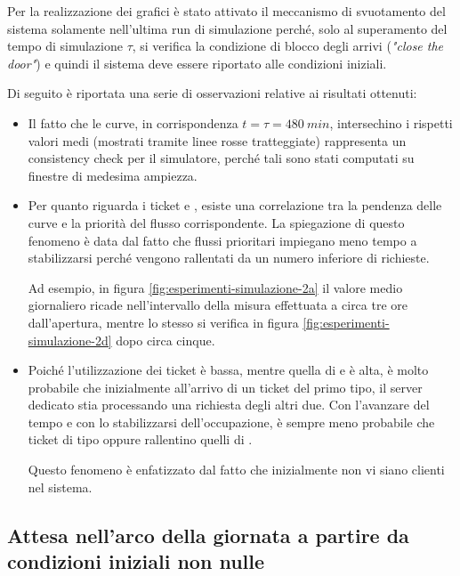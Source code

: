 Per la realizzazione dei grafici è stato attivato il meccanismo di svuotamento del sistema solamente nell'ultima run di simulazione perché, solo al superamento del tempo di simulazione $\tau$, si verifica la condizione di blocco degli arrivi (\textit{"close the door"}) e quindi il sistema deve essere riportato alle condizioni iniziali.

Di seguito è riportata una serie di osservazioni relative ai risultati ottenuti:
\begin{itemize}
\item Il fatto che le curve, in corrispondenza $t = \tau = 480\ min$, intersechino i rispetti valori medi (mostrati tramite linee rosse tratteggiate) rappresenta un consistency check per il simulatore, perché tali sono stati computati su finestre di medesima ampiezza.
\item Per quanto riguarda i ticket \uo{} e \pp{}, esiste una correlazione tra la pendenza delle curve e la priorità del flusso corrispondente. La spiegazione di questo fenomeno è data dal fatto che flussi prioritari impiegano meno tempo a stabilizzarsi perché vengono rallentati da un numero inferiore di richieste.

Ad esempio, in figura \ref{fig:esperimenti-simulazione-2a} il valore medio giornaliero ricade nell'intervallo della misura effettuata a circa tre ore dall'apertura, mentre lo stesso si verifica in figura \ref{fig:esperimenti-simulazione-2d} dopo circa cinque.
\item Poiché l'utilizzazione dei ticket \sr{} è bassa, mentre quella di \uo{} e \pp{} è alta, è molto probabile che inizialmente all'arrivo di un ticket del primo tipo, il server dedicato stia processando una richiesta degli altri due. Con l'avanzare del tempo e con lo stabilizzarsi dell'occupazione, è sempre meno probabile che ticket di tipo \uo{} oppure \pp{} rallentino quelli di \sr{}. 

Questo fenomeno è enfatizzato dal fatto che inizialmente non vi siano clienti nel sistema. 
\end{itemize}

\subsection*{Attesa nell'arco della giornata a partire da condizioni iniziali non nulle}

